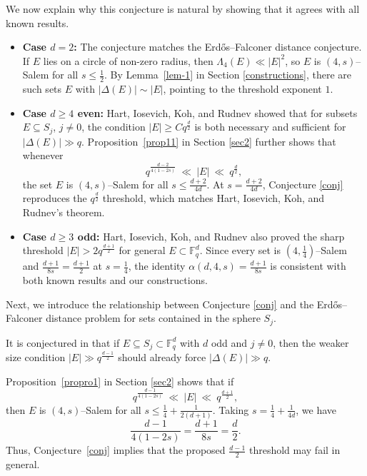 \documentclass[11pt]{article}
\def\F{\mathbb{F}}
\begin{document}
We now explain why this conjecture is natural by showing that it agrees with all known results. 
\begin{itemize}
\item \textbf{Case $d = 2$:} The conjecture matches the Erd\H{o}s--Falconer distance conjecture. If $E$ lies on a circle of non-zero radius, then $\Lambda_4(E)\ll |E|^2$, so $E$ is $(4,s)$--Salem for all $s\le\tfrac12$.  By Lemma~\ref{lem-1} in Section \ref{constructions},  there are such sets $E$ with $|\Delta(E)|\sim |E|$, pointing to the threshold exponent $1$. 

\item \textbf{Case $d \geq 4$ even:} Hart, Iosevich, Koh, and Rudnev \cite{HIKR11} showed that for subsets $E\subseteq S_j$, $j\ne 0$, the condition $|E|\ge C q^{\frac{d}{2}}$ is both necessary and sufficient for $|\Delta(E)|\gg q$. Proposition~\ref{prop11}  in Section \ref{sec2} further shows that whenever
\[
q^{\frac{d-2}{4(1-2s)}}\ \ll\ |E|\ \ll\ q^{\frac{d}{2}},
\]
the set $E$ is $(4,s)$--Salem for all $s\le\tfrac{d+2}{4d}$. At $s=\tfrac{d+2}{4d}$, Conjecture \ref{conj} reproduces the $q^{\frac{d}{2}}$ threshold, which matches Hart, Iosevich, Koh, and Rudnev's theorem.

\item  \textbf{Case $d \geq 3$ odd:} Hart, Iosevich, Koh, and Rudnev \cite{HIKR11} also proved the sharp threshold $|E|>2 q^{\frac{d+1}{2}}$ for general $E\subset\F_q^d$. Since every set is $(4,\tfrac14)$--Salem and $\tfrac{d+1}{8s}=\tfrac{d+1}{2}$ at $s=\tfrac14$, the identity $\alpha(d,4,s)=\tfrac{d+1}{8s}$ is consistent with both known results and our constructions.
\end{itemize}

Next, we introduce the relationship between Conjecture \ref{conj} and the Erd\H{o}s--Falconer distance problem for sets contained in the sphere $S_j$.

It is conjectured in \cite{HIKR11} that if $E\subseteq S_j\subset \F_q^d$ with $d$ odd and $j\neq 0$, then the weaker size condition $|E|\gg q^{\frac{d-1}{2}}$ should already force $|\Delta(E)|\gg q$. 


Proposition~\ref{propro1} in Section \ref{sec2} shows that if
\[
q^{\frac{d-1}{4(1-2s)}} \ \ll\ |E| \ \ll\ q^{\frac{d+1}{2}},
\]
then $E$ is $(4,s)$--Salem for all $s\le \frac{1}{4}+\frac{1}{2(d+1)}$. Taking $s=\frac{1}{4}+\frac{1}{4d}$, we have 
\[\frac{d-1}{4(1-2s)} = \frac{d+1}{8s}=\frac{d}{2}.\]
Thus, Conjecture~\ref{conj}$\!$ implies that the proposed $\frac{d-1}{2}$ threshold may fail in general.
\end{document}

